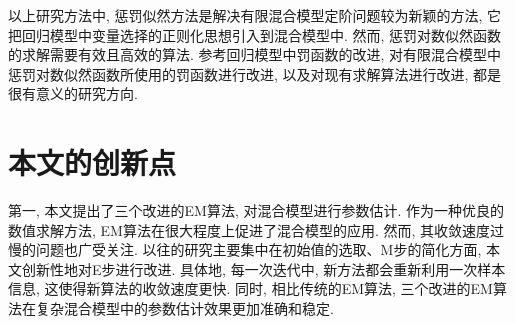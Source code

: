 \documentclass[a4paper,12pt,openany,oneside,utf-8]{ctexbook}
\begin{document}
以上研究方法中, 惩罚似然方法是解决有限混合模型定阶问题较为新颖的方法, 它把回归模型中变量选择的正则化思想引入到混合模型中. 然而, 惩罚对数似然函数的求解需要有效且高效的算法. 参考回归模型中罚函数的改进, 对有限混合模型中惩罚对数似然函数所使用的罚函数进行改进, 以及对现有求解算法进行改进, 都是很有意义的研究方向. 







\section{本文的创新点}
第一, 本文提出了三个改进的EM算法, 对混合模型进行参数估计. 作为一种优良的数值求解方法, EM算法在很大程度上促进了混合模型的应用. 然而, 其收敛速度过慢的问题也广受关注. 以往的研究主要集中在初始值的选取、M步的简化方面, 本文创新性地对E步进行改进. 具体地, 每一次迭代中, 新方法都会重新利用一次样本信息, 这使得新算法的收敛速度更快. 同时, 相比传统的EM算法, 三个改进的EM算法在复杂混合模型中的参数估计效果更加准确和稳定.
\end{document}
